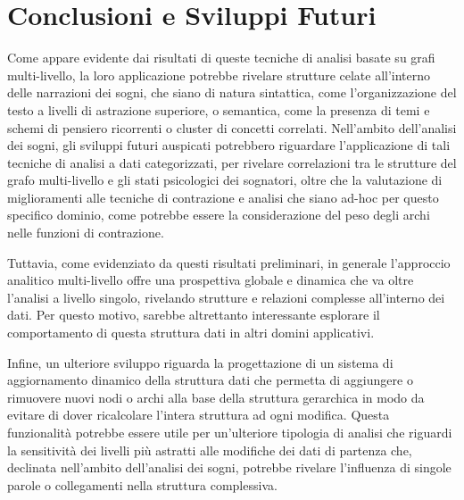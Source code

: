 \chapter*{Conclusioni e Sviluppi Futuri}

Come appare evidente dai risultati di queste tecniche di analisi basate su grafi multi-livello, la loro applicazione
potrebbe rivelare strutture celate all'interno delle narrazioni dei sogni, che siano di natura sintattica, come
l'organizzazione del testo a livelli di astrazione superiore, o semantica, come la presenza di temi e schemi di
pensiero ricorrenti o cluster di concetti correlati.
Nell'ambito dell'analisi dei sogni, gli sviluppi futuri auspicati potrebbero riguardare l'applicazione di tali
tecniche di analisi a dati categorizzati, per rivelare correlazioni tra le strutture del grafo multi-livello
e gli stati psicologici dei sognatori, oltre che la valutazione di miglioramenti alle tecniche di contrazione e
analisi che siano ad-hoc per questo specifico dominio, come potrebbe essere la considerazione del peso degli archi
nelle funzioni di contrazione.

Tuttavia, come evidenziato da questi risultati preliminari, in generale l'approccio analitico multi-livello offre
una prospettiva globale e dinamica che va oltre l'analisi a livello singolo, rivelando strutture e relazioni complesse
all'interno dei dati.
Per questo motivo, sarebbe altrettanto interessante esplorare il comportamento di questa struttura dati in altri
domini applicativi.

Infine, un ulteriore sviluppo riguarda la progettazione di un sistema di aggiornamento dinamico
della struttura dati che permetta di aggiungere o rimuovere nuovi nodi o archi alla base della struttura
gerarchica in modo da evitare di dover ricalcolare l'intera struttura ad ogni modifica.
Questa funzionalità potrebbe essere utile per un'ulteriore tipologia di analisi che riguardi la
sensitività dei livelli più astratti alle modifiche dei dati di partenza che, declinata nell'ambito dell'analisi
dei sogni, potrebbe rivelare l'influenza di singole parole o collegamenti nella struttura complessiva.

